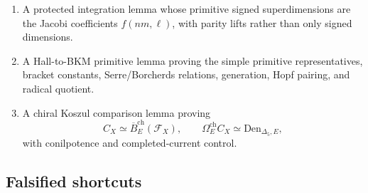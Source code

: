 \begin{enumerate}
\item A protected integration lemma whose primitive signed
superdimensions are the Jacobi coefficients \(f(nm,\ell)\), with
parity lifts rather than only signed dimensions.

\item A Hall-to-BKM primitive lemma proving the simple primitive
representatives, bracket constants, Serre/Borcherds relations,
generation, Hopf pairing, and radical quotient.

\item A chiral Koszul comparison lemma proving
\[
       C_X\simeq \overline B^{\mathrm{ch}}_E(\mathcal F_X),
       \qquad
       \Omega^{\mathrm{ch}}_E C_X\simeq \mathrm{Den}_{\Delta_5,E},
\]
with conilpotence and completed-current control.
\end{enumerate}

\subsection{Falsified shortcuts}

